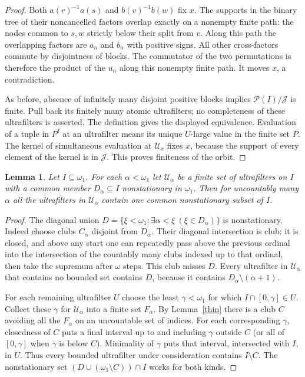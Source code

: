 \documentclass[11pt]{article}
\newtheorem{lemma}[theorem]{Lemma}
\begin{document}
\begin{proof}
Both $a(r)^{-1}a(s)$ and $b(v)^{-1}b(w)$ fix $x$. The supports in the binary tree of their noncancelled factors overlap exactly on a nonempty finite path: the nodes common to $s,w$ strictly below their split from $v$. Along this path the overlapping factors are $a_n$ and $b_n$ with positive signs. All other cross-factors commute by disjointness of blocks. The commutator of the two permutations is therefore the product of the $u_n$ along this nonempty finite path. It moves $x$, a contradiction.

As before, absence of infinitely many disjoint positive blocks implies $\mathcal P(I)/\mathcal J$ is finite. Pull back its finitely many atomic ultrafilters; no completeness of these ultrafilters is asserted. The definition gives the displayed equivalence. Evaluation of a tuple in $P^I$ at an ultrafilter means its unique $U$-large value in the finite set $P$. The kernel of simultaneous evaluation at $\mathcal U_x$ fixes $x$, because the support of every element of the kernel is in $\mathcal J$. This proves finiteness of the orbit.
\end{proof}

\begin{lemma}\label{thinultra}
Let $I\subseteq\omega_1$. For each $\alpha<\omega_1$ let $\mathcal U_\alpha$ be a finite set of ultrafilters on $I$ with a common member $D_\alpha\subseteq I$ nonstationary in $\omega_1$. Then for uncountably many $\alpha$ all the ultrafilters in $\mathcal U_\alpha$ contain one common nonstationary subset of $I$.
\end{lemma}
\begin{proof}
The diagonal union $D=\{\xi<\omega_1:\exists\alpha<\xi\ (\xi\in D_\alpha)\}$ is nonstationary. Indeed choose clubs $C_\alpha$ disjoint from $D_\alpha$. Their diagonal intersection is club: it is closed, and above any start one can repeatedly pass above the previous ordinal into the intersection of the countably many clubs indexed up to that ordinal, then take the supremum after $\omega$ steps. This club misses $D$. Every ultrafilter in $\mathcal U_\alpha$ that contains no bounded set contains $D$, because it contains $D_\alpha\setminus(\alpha+1)$.

For each remaining ultrafilter $U$ choose the least $\gamma<\omega_1$ for which $I\cap[0,\gamma]\in U$. Collect these $\gamma$ for $\mathcal U_\alpha$ into a finite set $F_\alpha$. By Lemma~\ref{thin} there is a club $C$ avoiding all the $F_\alpha$ on an uncountable set of indices. For each corresponding $\gamma$, closedness of $C$ puts a final interval up to and including $\gamma$ outside $C$ (or all of $[0,\gamma]$ when $\gamma$ is below $C$). Minimality of $\gamma$ puts that interval, intersected with $I$, in $U$. Thus every bounded ultrafilter under consideration contains $I\setminus C$. The nonstationary set $(D\cup(\omega_1\setminus C))\cap I$ works for both kinds.
\end{proof}
\end{document}

